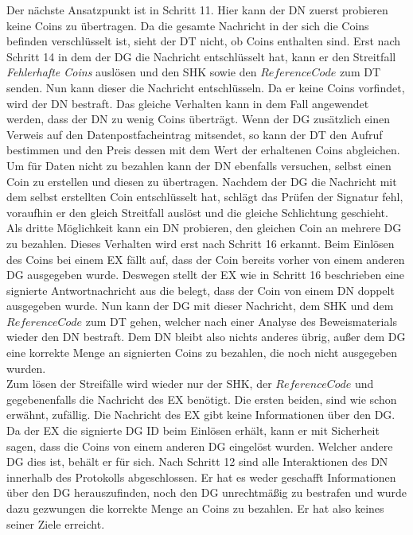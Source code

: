 \documentclass[
	fontsize=11pt,
	headings=small,
	parskip=half,           %
	bibliography=totoc,
	numbers=noenddot,       %
	open=any,               %
]{scrreprt}
\begin{document}
Der nächste Ansatzpunkt ist in Schritt 11. Hier kann der DN zuerst probieren keine Coins zu übertragen. Da die gesamte Nachricht in der sich die Coins befinden verschlüsselt ist, sieht der DT nicht, ob Coins enthalten sind. Erst nach Schritt 14 in dem der DG die Nachricht entschlüsselt hat, kann er den Streitfall \textit{Fehlerhafte Coins} auslösen und den SHK sowie den $ReferenceCode$ zum DT senden. Nun kann dieser die Nachricht entschlüsseln. Da er keine Coins vorfindet, wird der DN bestraft. Das gleiche Verhalten kann in dem Fall angewendet werden, dass der DN zu wenig Coins überträgt. Wenn der DG zusätzlich einen Verweis auf den Datenpostfacheintrag mitsendet, so kann der DT den Aufruf bestimmen und den Preis dessen mit dem Wert der erhaltenen Coins abgleichen. Um für Daten nicht zu bezahlen kann der DN ebenfalls versuchen, selbst einen Coin zu erstellen und diesen zu übertragen. Nachdem der DG die Nachricht mit dem selbst erstellten Coin entschlüsselt hat, schlägt das Prüfen der Signatur fehl, voraufhin er den gleich Streitfall auslöst und die gleiche Schlichtung geschieht. Als dritte Möglichkeit kann ein DN probieren, den gleichen Coin an mehrere DG zu bezahlen. Dieses Verhalten wird erst nach Schritt 16 erkannt. Beim Einlösen des Coins bei einem EX fällt auf, dass der Coin bereits vorher von einem anderen DG ausgegeben wurde. Deswegen stellt der EX wie in Schritt 16 beschrieben eine signierte Antwortnachricht aus die belegt, dass der Coin von einem DN doppelt ausgegeben wurde. Nun kann der DG mit dieser Nachricht, dem SHK und dem $ReferenceCode$ zum DT gehen, welcher nach einer Analyse des Beweismaterials wieder den DN bestraft. Dem DN bleibt also nichts anderes übrig, außer dem DG eine korrekte Menge an signierten Coins zu bezahlen, die noch nicht ausgegeben wurden.\\

Zum lösen der Streifälle wird wieder nur der SHK, der $ReferenceCode$ und gegebenenfalls die Nachricht des EX benötigt. Die ersten beiden, sind wie schon erwähnt, zufällig. Die Nachricht des EX gibt keine Informationen über den DG. Da der EX die signierte DG ID beim Einlösen erhält, kann er mit Sicherheit sagen, dass die Coins von einem anderen DG eingelöst wurden. Welcher andere DG dies ist, behält er für sich. Nach Schritt 12 sind alle Interaktionen des DN innerhalb des Protokolls abgeschlossen. Er hat es weder geschafft Informationen über den DG herauszufinden, noch den DG unrechtmäßig zu bestrafen und wurde dazu gezwungen die korrekte Menge an Coins zu bezahlen. Er hat also keines seiner Ziele erreicht.
\end{document}

